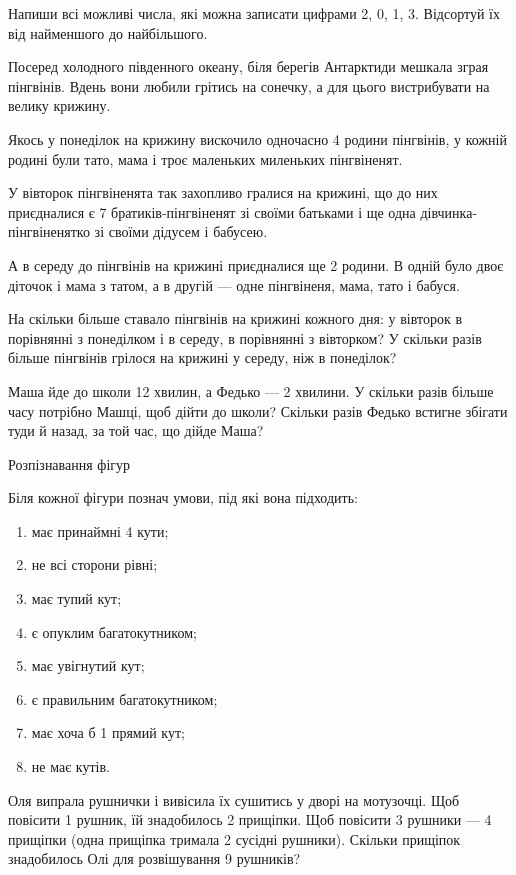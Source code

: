 \problem
Напиши всі можливі числа, які можна записати цифрами 2, 0, 1, 3.
Відсортуй їх від найменшого до найбільшого.


\problem
Посеред холодного південного океану, біля берегів Антарктиди мешкала
зграя пінгвінів. Вдень вони любили грітись на сонечку, а для цього
вистрибувати на велику крижину.

Якось у понеділок на крижину вискочило одночасно 4 родини пінгвінів,
у кожній родині були тато, мама і троє маленьких миленьких пінгвіненят.

У вівторок пінгвіненята так захопливо гралися на крижині,
що до них приєдналися є 7 братиків-пінгвіненят зі своїми батьками
і ще одна дівчинка-пінгвіненятко зі своїми дідусем і бабусею.

А в середу до пінгвінів на крижині приєдналися ще 2 родини.
В одній було двоє діточок і мама з татом, а в другій --- 
одне пінгвіненя, мама, тато і бабуся.

На скільки більше ставало пінгвінів на крижині кожного дня:
у вівторок в порівнянні з понеділком і в середу, в порівнянні з вівторком?
У скільки разів більше пінгвінів грілося на крижині у середу, ніж в понеділок?


\problem
Маша йде до школи 12 хвилин, а Федько --- 2 хвилини.
У скільки разів більше часу потрібно Машці, щоб дійти до школи?
Скільки разів Федько встигне збігати туди й назад, за той час, що дійде Маша?


\problem
Розпізнавання фігур

Біля кожної фігури познач умови, під які вона підходить:
\begin{enumerate}
    \item має принаймні 4 кути;
    \item не всі сторони рівні;
    \item має тупий кут;
    \item є опуклим багатокутником;
    \item має увігнутий кут;
    \item є правильним багатокутником;
    \item має хоча б 1 прямий кут;
    \item не має кутів.
\end{enumerate}


\problem
Оля випрала рушнички і вивісила їх сушитись у дворі на мотузочці.
Щоб повісити 1 рушник, їй знадобилось 2 прищіпки.
Щоб повісити 3 рушники --- 4 прищіпки (одна прищіпка тримала 2 сусідні рушники).
Скільки прищіпок знадобилось Олі для розвішування 9 рушників?



